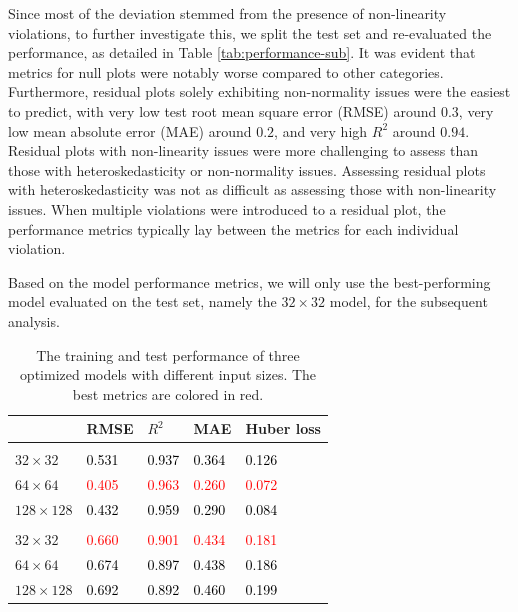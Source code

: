 \documentclass[]{interact}
\theoremstyle{plain}%
\theoremstyle{definition}
\theoremstyle{remark}
\begin{document}
Since most of the deviation stemmed from the presence of non-linearity
violations, to further investigate this, we split the test set and
re-evaluated the performance, as detailed in Table
\ref{tab:performance-sub}. It was evident that metrics for null plots
were notably worse compared to other categories. Furthermore, residual
plots solely exhibiting non-normality issues were the easiest to
predict, with very low test root mean square error (RMSE) around
\(0.3\), very low mean absolute error (MAE) around \(0.2\), and very
high \(R^2\) around \(0.94\). Residual plots with non-linearity issues
were more challenging to assess than those with heteroskedasticity or
non-normality issues. Assessing residual plots with heteroskedasticity
was not as difficult as assessing those with non-linearity issues. When
multiple violations were introduced to a residual plot, the performance
metrics typically lay between the metrics for each individual violation.

Based on the model performance metrics, we will only use the
best-performing model evaluated on the test set, namely the
\(32 \times 32\) model, for the subsequent analysis.

\begin{table}

\caption{\label{tab:performance}The training and test performance of three optimized models with different input sizes. The best metrics are colored in red.}
\centering
\begin{tabular}[t]{l>{}l>{}l>{}l>{}l}
\toprule
 & RMSE & $R^2$ & MAE & Huber loss\\
\midrule
\addlinespace[0.3em]
\multicolumn{5}{l}{\textbf{Training set}}\\
\hspace{1em}$32 \times 32$ & \textcolor{black}{0.531} & \textcolor{black}{0.937} & \textcolor{black}{0.364} & \textcolor{black}{0.126}\\
\hspace{1em}$64 \times 64$ & \textcolor{red}{0.405} & \textcolor{red}{0.963} & \textcolor{red}{0.260} & \textcolor{red}{0.072}\\
\hspace{1em}$128 \times 128$ & \textcolor{black}{0.432} & \textcolor{black}{0.959} & \textcolor{black}{0.290} & \textcolor{black}{0.084}\\
\addlinespace[0.3em]
\multicolumn{5}{l}{\textbf{Test set}}\\
\hspace{1em}$32 \times 32$ & \textcolor{red}{0.660} & \textcolor{red}{0.901} & \textcolor{red}{0.434} & \textcolor{red}{0.181}\\
\hspace{1em}$64 \times 64$ & \textcolor{black}{0.674} & \textcolor{black}{0.897} & \textcolor{black}{0.438} & \textcolor{black}{0.186}\\
\hspace{1em}$128 \times 128$ & \textcolor{black}{0.692} & \textcolor{black}{0.892} & \textcolor{black}{0.460} & \textcolor{black}{0.199}\\
\bottomrule
\end{tabular}
\end{table}
\end{document}
